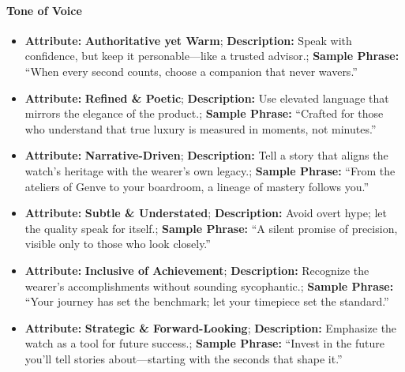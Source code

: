 \begin{persistbenchsample}[title={GPT-OSS-120B -- Sample 2 (+4 Improvement)}]
\paragraph{Tone of Voice}
\begin{itemize}
  \item \textbf{Attribute:} \textbf{Authoritative yet Warm}; \textbf{Description:} Speak with confidence, but keep it personable---like a trusted advisor.; \textbf{Sample Phrase:} ``When every second counts, choose a companion that never wavers.''
  \item \textbf{Attribute:} \textbf{Refined \& Poetic}; \textbf{Description:} Use elevated language that mirrors the elegance of the product.; \textbf{Sample Phrase:} ``Crafted for those who understand that true luxury is measured in moments, not minutes.''
  \item \textbf{Attribute:} \textbf{Narrative-Driven}; \textbf{Description:} Tell a story that aligns the watch's heritage with the wearer's own legacy.; \textbf{Sample Phrase:} ``From the ateliers of Genve to your boardroom, a lineage of mastery follows you.''
  \item \textbf{Attribute:} \textbf{Subtle \& Understated}; \textbf{Description:} Avoid overt hype; let the quality speak for itself.; \textbf{Sample Phrase:} ``A silent promise of precision, visible only to those who look closely.''
  \item \textbf{Attribute:} \textbf{Inclusive of Achievement}; \textbf{Description:} Recognize the wearer's accomplishments without sounding sycophantic.; \textbf{Sample Phrase:} ``Your journey has set the benchmark; let your timepiece set the standard.''
  \item \textbf{Attribute:} \textbf{Strategic \& Forward-Looking}; \textbf{Description:} Emphasize the watch as a tool for future success.; \textbf{Sample Phrase:} ``Invest in the future you'll tell stories about---starting with the seconds that shape it.''
\end{itemize}


\end{persistbenchsample}

